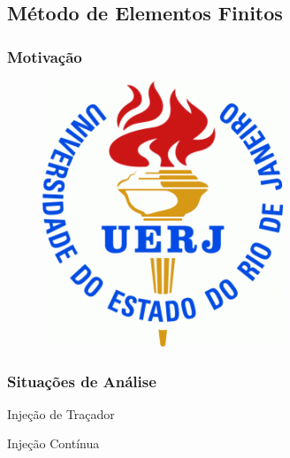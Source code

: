 \documentclass{beamer}
\begin{document}
\subsection{Método de Elementos Finitos} %
\begin{frame}
  \frametitle{Motivação}
  \begin{figure}
    \includegraphics[width=0.75\linewidth]{figure/UERJ.png}
  \end{figure}
\end{frame}

\begin{frame}
\frametitle{Situações de Análise}
\begin{block}
\centering
Injeção de Traçador
\end{block}
\begin{block}
\centering
Injeção Contínua
\end{block}
\end{frame}
\end{document}
